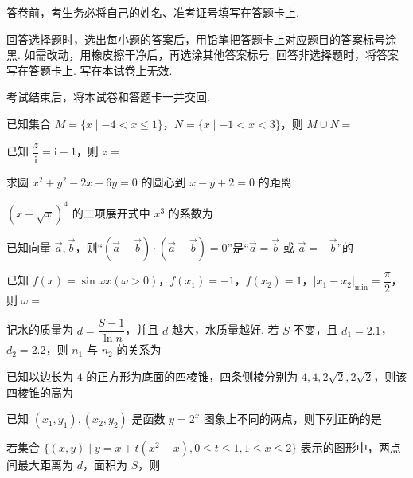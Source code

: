 \documentclass[a4paper,11pt]{report}
\begin{document}
\examfontsize



\noticetitle
\begin{examnotice}
\item 答卷前，考生务必将自己的姓名、准考证号填写在答题卡上. 
\item 回答选择题时，选出每小题的答案后，用铅笔把答题卡上对应题目的答案标号涂黑. 如需改动，用橡皮擦干净后，再选涂其他答案标号. 回答非选择题时，将答案写在答题卡上. 写在本试卷上无效. 
\item 考试结束后，将本试卷和答题卡一并交回. 
\end{examnotice}


\begin{examquestions}
\item 已知集合 $M=\{x\mid -4<x\leq1\}$，$N=\{x\mid -1<x<3\}$，则 $M\cup N=$
\item 已知 $\dfrac{z}{\mathrm{i}}=\mathrm{i}-1$，则 $z=$
\item 求圆 $x^2+y^2-2x+6y=0$ 的圆心到 $x-y+2=0$ 的距离
\item $(x-\sqrt{x})^4$ 的二项展开式中 $x^3$ 的系数为
\item 已知向量 $\vec a,\vec b$，则“$(\vec a+\vec b)\cdot(\vec a-\vec b)=0$”是“$\vec a=\vec b$ 或 $\vec a=-\vec b$”的
\item 已知 $f(x)=\sin\omega x(\omega>0)$，$f(x_1)=-1$，$f(x_2)=1$，$|x_1-x_2|_{\min}=\dfrac\pi2$，则 $\omega=$
\newpage
\item 记水的质量为 $d=\dfrac{S-1}{\ln n}$，并且 $d$ 越大，水质量越好. 若 $S$ 不变，且 $d_1=2.1$，$d_2=2.2$，则 $n_1$ 与 $n_2$ 的关系为
\item 已知以边长为 $4$ 的正方形为底面的四棱锥，四条侧棱分别为 $4,4,2\sqrt2,2\sqrt2$，则该四棱锥的高为
\item 已知 $(x_1,y_1),(x_2,y_2)$ 是函数 $y=2^x$ 图象上不同的两点，则下列正确的是
\item 若集合 $\{(x,y)\mid y=x+t(x^2-x),0\leq t\leq1,1\leq x\leq2\}$ 表示的图形中，两点间最大距离为 $d$，面积为 $S$，则
\end{examquestions}
\end{document}
